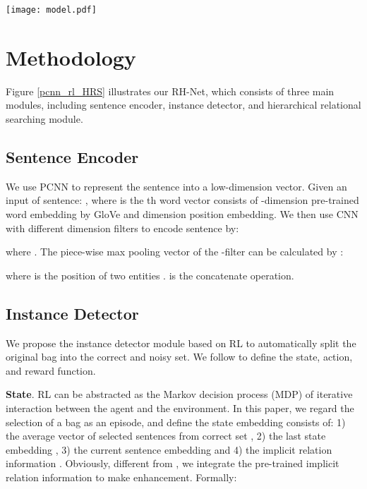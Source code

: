 \documentclass{article}
\begin{document}
\begin{figure*}[htbp]
\centerline{\texttt{[image: model.pdf]}}
\caption{The architecture of our proposed RH-Net. The left is the instance detector, which aims to select high-quality data-driven by RL. The right is the hierarchical relational searching module, which views relation extraction as a top-to-down search processing.}
\label{pcnn_rl_HRS}
\end{figure*}


\section{Methodology}

Figure \ref{pcnn_rl_HRS} illustrates our RH-Net, which consists of three main modules, including sentence encoder, instance detector, and hierarchical relational searching module.





\subsection{Sentence Encoder}

We use PCNN \cite{Zeng2015Distant} to represent the sentence into a low-dimension vector. Given an input of sentence: , where  is the th word vector consists of -dimension pre-trained word embedding by GloVe \cite{pennington2014glove} and dimension position embedding. We then use CNN with  different dimension filters to encode sentence by:

where . The piece-wise max pooling vector of the -filter can be calculated by :

where  is the position of two entities .  is the concatenate operation.





\subsection{Instance Detector}

We propose the instance detector module based on RL to automatically split the original bag into the correct and noisy set. We follow \cite{Feng2018Reinforcement} to define the state, action, and reward function.

\textbf{State}. RL can be abstracted as the Markov decision process (MDP) of iterative interaction between the agent and the environment. In this paper, we regard the selection of a bag as an episode, and define the state embedding  consists of: 1) the average vector of selected sentences from correct set , 2) the last state embedding , 3) the current sentence embedding  and 4) the implicit relation information . Obviously, different from \cite{Feng2018Reinforcement,he2019improving,Qin2018Robust}, we integrate the pre-trained implicit relation information to make enhancement. Formally:
\end{document}
